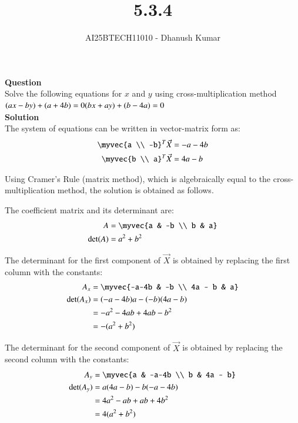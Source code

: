 \documentclass[journal]{IEEEtran}
\begin{document}
\title{5.3.4}
\author{AI25BTECH11010 - Dhanush Kumar}
\maketitle
\renewcommand{\thefigure}{\theenumi}
\renewcommand{\thetable}{\theenumi}

\textbf{Question}\\
\noindent
Solve the following equations for $x$ and $y$ using cross-multiplication method\\
$
(ax - by) + (a + 4b) = 0 \\
(bx + ay) + (b - 4a) = 0
$\\
\textbf{Solution}\\

The system of equations can be written in vector-matrix form as:
\begin{align}
\myvec{a \\ -b}^T\vec{X} &= -a - 4b \\
\myvec{b \\ a}^T\vec{X} &= 4a - b
\end{align}

Using Cramer's Rule (matrix method), which is algebraically equal to the cross-multiplication method, the solution is obtained as follows.

The coefficient matrix and its determinant are:
\begin{align}
A &= \myvec{a & -b \\ b & a} \\
\det(A) &= a^2 + b^2
\end{align}

The determinant for the first component of $\vec{X}$ is obtained by replacing the first column with the constants:
\begin{align}
A_x &= \myvec{-a-4b & -b \\ 4a - b & a} \\
\det(A_x) &= (-a-4b)a - (-b)(4a-b) \\
&= -a^2 - 4ab + 4ab - b^2 \\
&= -(a^2 + b^2)
\end{align}

The determinant for the second component of $\vec{X}$ is obtained by replacing the second column with the constants:
\begin{align}
A_y &= \myvec{a & -a-4b \\ b & 4a - b} \\
\det(A_y) &= a(4a-b) - b(-a-4b) \\
&= 4a^2 - ab + ab + 4b^2 \\
&= 4(a^2 + b^2)
\end{align}
\end{document}
